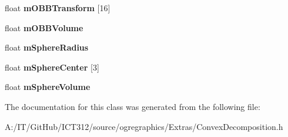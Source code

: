 \begin{DoxyCompactItemize}
\item 
\hypertarget{class_convex_decomposition_1_1_convex_result_ab47652a96740e87a4429fc814b8a8514}{float {\bfseries m\-O\-B\-B\-Transform} \mbox{[}16\mbox{]}}\label{class_convex_decomposition_1_1_convex_result_ab47652a96740e87a4429fc814b8a8514}

\item 
\hypertarget{class_convex_decomposition_1_1_convex_result_a853b2f5ff4672523fd757b087e7d4966}{float {\bfseries m\-O\-B\-B\-Volume}}\label{class_convex_decomposition_1_1_convex_result_a853b2f5ff4672523fd757b087e7d4966}

\item 
\hypertarget{class_convex_decomposition_1_1_convex_result_ab06db274a09247f65760cd634b535445}{float {\bfseries m\-Sphere\-Radius}}\label{class_convex_decomposition_1_1_convex_result_ab06db274a09247f65760cd634b535445}

\item 
\hypertarget{class_convex_decomposition_1_1_convex_result_ac25b672d8760308c3bb7cbadec3551a3}{float {\bfseries m\-Sphere\-Center} \mbox{[}3\mbox{]}}\label{class_convex_decomposition_1_1_convex_result_ac25b672d8760308c3bb7cbadec3551a3}

\item 
\hypertarget{class_convex_decomposition_1_1_convex_result_a04711a2ef01d11c920758058ba491357}{float {\bfseries m\-Sphere\-Volume}}\label{class_convex_decomposition_1_1_convex_result_a04711a2ef01d11c920758058ba491357}

\end{DoxyCompactItemize}


The documentation for this class was generated from the following file\-:\begin{DoxyCompactItemize}
\item 
A\-:/\-I\-T/\-Git\-Hub/\-I\-C\-T312/source/ogregraphics/\-Extras/Convex\-Decomposition.\-h\end{DoxyCompactItemize}

